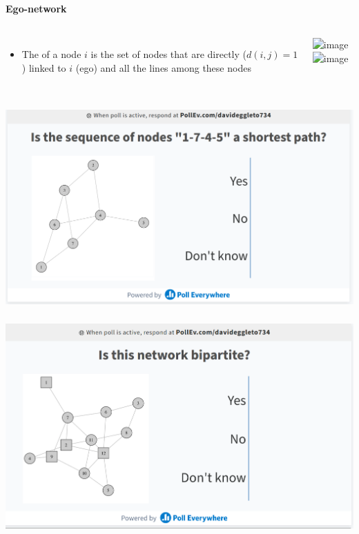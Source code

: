 \documentclass[8pt]{beamer}
\begin{document}

\begin{frame}
\frametitle{\insertsection}
\framesubtitle{Ego-network}

\begin{columns}[c]
\begin{itemize}[<+->]
	\item The {\color{blue}{ego-network}} of a node $i$ is the set of nodes that are directly ($d(i,j)=1$) linked to $i$ (ego) and all the lines among these nodes
\end{itemize}

\centering
\includegraphics<1>[width=5cm]{base}
\includegraphics<2>[width=5cm]{egonet}

\end{columns}

\end{frame}


\begin{frame}
\frametitle{\insertsection}
\centering
\includegraphics[width=\linewidth, frame]{poll2}
\end{frame}


\begin{frame}
\frametitle{\insertsection}
\centering
\includegraphics[width=\linewidth, frame]{poll3}
\end{frame}
\end{document}
